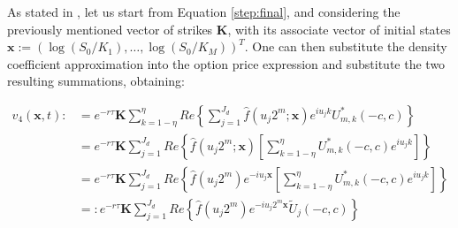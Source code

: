 \documentclass[12,twoside]{mammeTFM}
\theoremstyle{definition}
\theoremstyle{remark}
\begin{document}
As stated in \cite{mar17}, let us start from Equation \ref{step:final}, and considering the previously mentioned vector of strikes $\boldsymbol{K}$, with its associate vector of initial states $\boldsymbol{x} := (\log(S_0/K_1), \ldots, \log(S_0/K_M))^{T}$. One can then substitute the density coefficient approximation into the option price expression and substitute the two resulting summations, obtaining:

\begin{align}
v_4(\boldsymbol{x}, t) :&=  e^{-r\tau} \boldsymbol{K} \sum_{k = 1 - \eta}^{\eta} Re \left\{ \sum_{j=1}^{J_d} \hat{f}(u_j 2^m; \boldsymbol{x}) e^{i u_j k} U_{m,k}^{*}(-c,c) \right\} \\
& =e^{-r\tau}\boldsymbol{K} \sum_{j=1}^{J_d} Re \left\{ \hat{f}(u_j 2^m;\boldsymbol{x}) \left[ \sum_{k = 1-\eta}^{\eta} U_{m,k}^{*}(-c,c) e^{i u_j k} \right] \right\} \\
&= e^{-r\tau}\boldsymbol{K} \sum_{j=1}^{J_d} Re \left\{ \hat{f}(u_j 2^m) e^{-i u_j \boldsymbol{x}} \left[ \sum_{k = 1-\eta}^{\eta} U_{m,k}^{*}(-c,c) e^{i u_j k} \right] \right\} \\
\label{step:alternative_final}
&=: e^{-r\tau}\boldsymbol{K} \sum_{j=1}^{J_d} Re \left\{ \hat{f}(u_j 2^m) e^{-i u_j 2^m \boldsymbol{x}} \tilde{U}_j(-c,c) \right\}
\end{align}
\end{document}
